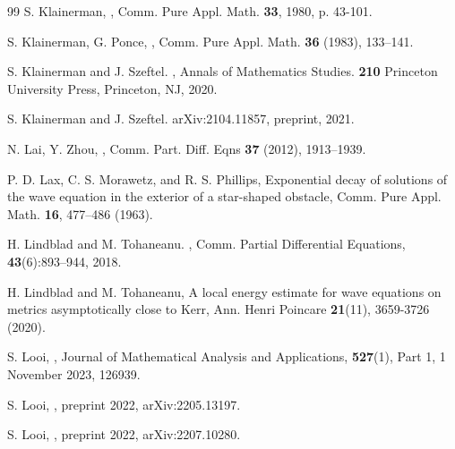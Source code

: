 \documentclass[10pt,a4paper,reqno]{amsart}
\theoremstyle{definition}
\theoremstyle{remark}
\numberwithin{equation}{section}
\begin{document}
\begin{thebibliography}{99}
 S. Klainerman,
,
\newblock Comm. Pure Appl. Math. \textbf{33}, 1980, p. 43-101.

 S. Klainerman, G. Ponce,
,
\newblock Comm. Pure Appl. Math. \textbf{36} (1983), 133--141.

 S. Klainerman and J. Szeftel. 
, \newblock Annals of Mathematics Studies. \textbf{210} Princeton University Press, Princeton, NJ, 2020. %

 S. Klainerman and J. Szeftel. 
\newblock arXiv:2104.11857, preprint, 2021.%


 N. Lai, Y. Zhou,
,
\newblock Comm. Part. Diff. Eqns \textbf{37} (2012), 1913–1939.

 P. D. Lax, C. S. Morawetz, and R. S. Phillips,
\newblock Exponential decay of solutions of the wave equation in the exterior of a star-shaped obstacle,
\newblock Comm. Pure Appl. Math. \textbf{16}, 477–486 (1963).

 H. Lindblad and M. Tohaneanu. 
, 
\newblock Comm. Partial Differential Equations, \textbf{43}(6):893–944, 2018.

 H. Lindblad and M. Tohaneanu,
\newblock A local energy estimate for wave equations on metrics asymptotically close to Kerr,
\newblock Ann. Henri Poincare \textbf{21}(11), 3659-3726 (2020).

 S. Looi, 
,
\newblock Journal of Mathematical Analysis and Applications, \textbf{527}(1), Part 1, 1 November 2023, 126939.


 S. Looi, 
,
\newblock preprint 2022, arXiv:2205.13197.

 S. Looi, 
,
\newblock preprint 2022, arXiv:2207.10280.


\end{thebibliography}
\end{document}
